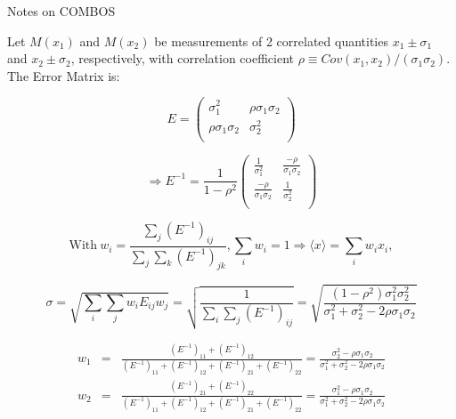 \documentclass[12pt,a4paper,dvips]{article}
\newcommand{\vaa}        {\ensuremath{\sigma_{1}^2}}
\newcommand{\vab}        {\ensuremath{\rho\sigma_{1}\sigma_{2}}}
\newcommand{\vbb}        {\ensuremath{\sigma_{2}^2}}
\newcommand{\saa}        {\ensuremath{\frac{1}{\sigma_{1}^2}}}
\newcommand{\sab}        {\ensuremath{\frac{-\rho}{\sigma_{1}\sigma_{2}}}}
\newcommand{\sbb}        {\ensuremath{\frac{1}{\sigma_{2}^2}}}
\begin{document}
 

\centerline{Notes on COMBOS}

Let $M(x_1)$ and $M(x_2)$ be measurements of 2 correlated quantities $x_1 \pm \sigma_1$ and $x_2 \pm \sigma_2$, respectively,
with correlation coefficient $\rho \equiv Cov(x_1,x_2)/(\sigma_1\sigma_2)$. The Error Matrix is:

\vspace*{-.5cm}

\begin{equation}
E =
\left( {\begin{array}{cc}
 \vaa & \vab  \\
 \vab & \vbb  \\
 \end{array} } \right)
\end{equation}

\begin{equation}
\Rightarrow
E^{-1} =
\frac{1}{1 - \rho^2}
\left( {\begin{array}{cc}
 \saa & \sab  \\
 \sab & \sbb  \\
 \end{array} } \right)
\end{equation}

\vspace*{-.5cm}

\begin{equation}
\mathrm{With~} w_i = \frac{\sum_j (E^{-1})_{ij}}{\sum_{j} \sum_{k} (E^{-1})_{jk}}, \sum_i w_i = 1 \Rightarrow \langle x \rangle = \sum_i w_i x_i,
\end{equation}

\begin{equation}
\sigma = \sqrt{\sum_i \sum_j w_i E_{ij} w_j}
         = \sqrt{\frac{1}{\sum_{i} \sum_{j} (E^{-1})_{ij}}}
         = \sqrt{\frac{(1-\rho^2)\sigma_1^2\sigma_2^2}{\sigma_1^2+\sigma_2^2-2\rho\sigma_1\sigma_2}}
\end{equation}

\vspace*{-.5cm}

\begin{eqnarray}
w_1 &=& \frac{(E^{-1})_{11}  + (E^{-1})_{12}}{(E^{-1})_{11}  + (E^{-1})_{12} + (E^{-1})_{21} + (E^{-1})_{22}} 
     = \frac{\sigma_2^2 - \rho\sigma_1\sigma_2}{\sigma_1^2 + \sigma_2^2 - 2\rho\sigma_1\sigma_2}\\
w_2 &=& \frac{(E^{-1})_{21}  + (E^{-1})_{22}}{(E^{-1})_{11}  + (E^{-1})_{12} + (E^{-1})_{21} + (E^{-1})_{22}} 
     = \frac{\sigma_1^2 - \rho\sigma_1\sigma_2}{\sigma_1^2 + \sigma_2^2 - 2\rho\sigma_1\sigma_2}
\end{eqnarray}
\end{document}
